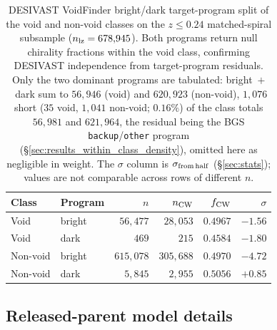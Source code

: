 \documentclass[aps,prd,twocolumn,superscriptaddress,showpacs,preprintnumbers,nofootinbib,longbibliography,floatfix]{revtex4-2}
\begin{document}
\begin{table}[ht]
\caption{DESIVAST VoidFinder bright/dark target-program split of
the void and non-void classes on the $z \leq 0.24$ matched-spiral
subsample ($n_{\rm lz} = 678{,}945$). Both programs return null
chirality fractions within the void class, confirming DESIVAST
independence from target-program residuals. Only the two dominant
programs are tabulated: bright~$+$~dark sum to $56{,}946$ (void) and
$620{,}923$ (non-void), $1{,}076$ short ($35$ void, $1{,}041$
non-void; $0.16\%$) of the class totals $56{,}981$ and $621{,}964$,
the residual being the BGS \texttt{backup}/\texttt{other} program
(\S\ref{sec:results_within_class_density}), omitted here as
negligible in weight. The $\sigma$ column
is $\sigma_{\rm from\,half}$ (\S\ref{sec:stats}); values are not
comparable across rows of different $n$.}
\label{tab:desivast_program_split}
\begin{ruledtabular}
\begin{tabular}{llrrrr}
Class & Program & $n$ & $n_{\rm CW}$ & $f_{\rm CW}$ & $\sigma$ \\
\hline
Void     & bright & $56{,}477$ & $28{,}053$ & $0.4967$ & $-1.56$ \\
Void     & dark   & $469$      & $215$      & $0.4584$ & $-1.80$ \\
Non-void & bright & $615{,}078$ & $305{,}688$ & $0.4970$ & $-4.72$ \\
Non-void & dark   & $5{,}845$  & $2{,}955$  & $0.5056$ & $+0.85$ \\
\end{tabular}
\end{ruledtabular}
\end{table}

\subsection{Released-parent model details}\label{sec:released_parent_primary}
\end{document}

